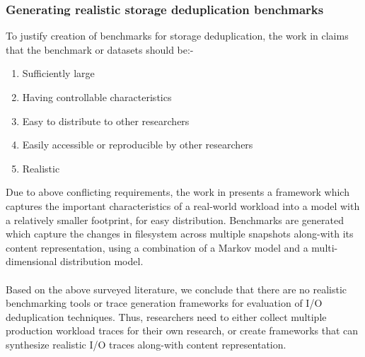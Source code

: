 \subsubsection{Generating realistic storage deduplication benchmarks}
To justify creation of benchmarks for storage deduplication, the work in
\cite{generating-datasets} claims that the benchmark or datasets should be:-
\begin{enumerate}
		\singlespacing
    \item Sufficiently large
    \item Having controllable characteristics
    \item Easy to distribute to other researchers
    \item Easily accessible or reproducible by other researchers
    \item Realistic
\end{enumerate}
Due to above conflicting requirements, the work in \cite{generating-datasets}
presents a framework which captures the important characteristics
of a real-world workload into a model with a relatively
smaller footprint, for easy distribution. 
Benchmarks are generated which capture the changes in filesystem 
across multiple snapshots along-with its content
representation, using a combination of a
Markov model and a multi-dimensional distribution model.
\\
\\
Based on the above surveyed literature, we conclude that there are no
realistic benchmarking tools or trace generation frameworks 
for evaluation of I/O deduplication techniques. Thus, 
researchers need to either collect multiple
production workload traces for their own research, or create frameworks
that can synthesize realistic I/O traces along-with content representation.

